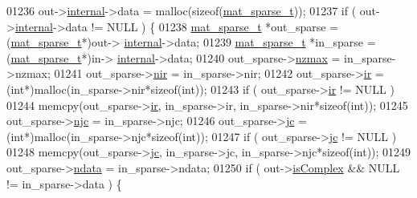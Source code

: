 \begin{DoxyCode}
{{{{{{{{{{{{{{{{{{{{{{{{{{{{{{01236                 out->\hyperlink{group___m_a_t_a6e97e3ed9f40c49322c18561c2a94e92}{internal}->data = malloc(\textcolor{keyword}{sizeof}(\hyperlink{group___m_a_t_structmat__sparse__t}{mat\_sparse\_t}));
01237                 \textcolor{keywordflow}{if} ( out->\hyperlink{group___m_a_t_a6e97e3ed9f40c49322c18561c2a94e92}{internal}->data != NULL ) \{
01238                     \hyperlink{group___m_a_t_structmat__sparse__t}{mat\_sparse\_t} *out\_sparse = (\hyperlink{group___m_a_t_structmat__sparse__t}{mat\_sparse\_t}*)out->
      \hyperlink{group___m_a_t_a6e97e3ed9f40c49322c18561c2a94e92}{internal}->data;
01239                     \hyperlink{group___m_a_t_structmat__sparse__t}{mat\_sparse\_t} *in\_sparse  = (\hyperlink{group___m_a_t_structmat__sparse__t}{mat\_sparse\_t}*)in->
      \hyperlink{group___m_a_t_a6e97e3ed9f40c49322c18561c2a94e92}{internal}->data;
01240                     out\_sparse->\hyperlink{group___m_a_t_ad79471861cb948e32671be6d4089173a}{nzmax} = in\_sparse->nzmax;
01241                     out\_sparse->\hyperlink{group___m_a_t_aa64636ad57cf87f7a28ff5018437a850}{nir} = in\_sparse->nir;
01242                     out\_sparse->\hyperlink{group___m_a_t_a8d4c863d704edddec5cbfa15b2d719c8}{ir} = (\textcolor{keywordtype}{int}*)malloc(in\_sparse->nir*\textcolor{keyword}{sizeof}(\textcolor{keywordtype}{int}));
01243                     \textcolor{keywordflow}{if} ( out\_sparse->\hyperlink{group___m_a_t_a8d4c863d704edddec5cbfa15b2d719c8}{ir} != NULL )
01244                         memcpy(out\_sparse->\hyperlink{group___m_a_t_a8d4c863d704edddec5cbfa15b2d719c8}{ir}, in\_sparse->ir, in\_sparse->nir*\textcolor{keyword}{sizeof}(\textcolor{keywordtype}{int}));
01245                     out\_sparse->\hyperlink{group___m_a_t_a482d8e4b40aa975f0c1daf146ebe08a4}{njc} = in\_sparse->njc;
01246                     out\_sparse->\hyperlink{group___m_a_t_ad1e74cdc4f7eff1e47a670297c01da4b}{jc} = (\textcolor{keywordtype}{int}*)malloc(in\_sparse->njc*\textcolor{keyword}{sizeof}(\textcolor{keywordtype}{int}));
01247                     \textcolor{keywordflow}{if} ( out\_sparse->\hyperlink{group___m_a_t_ad1e74cdc4f7eff1e47a670297c01da4b}{jc} != NULL )
01248                         memcpy(out\_sparse->\hyperlink{group___m_a_t_ad1e74cdc4f7eff1e47a670297c01da4b}{jc}, in\_sparse->jc, in\_sparse->njc*\textcolor{keyword}{sizeof}(\textcolor{keywordtype}{int}));
01249                     out\_sparse->\hyperlink{group___m_a_t_a1beb8a8c58a808207cbea650563a9b63}{ndata} = in\_sparse->ndata;
01250                     \textcolor{keywordflow}{if} ( out->\hyperlink{group___m_a_t_aeb03b3a69f108dc05470b00443a43739}{isComplex} && NULL != in\_sparse->data ) \{
}}}}}}}}}}}}}}}}}}}}}}}}}}}}}}
\end{DoxyCode}
